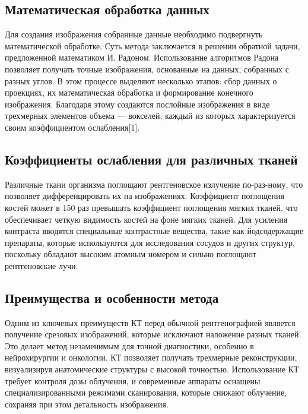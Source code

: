 \subsection{Математическая обработка данных}

Для создания изображения собранные данные необходимо подвергнуть математической обработке. Суть метода заключается в решении обратной задачи, предложенной математиком И. Радоном. Использование алгоритмов Радона позволяет получать точные изображения, основанные на данных, собранных с разных углов. В этом процессе выделяют несколько этапов: сбор данных о проекциях, их математическая обработка и формирование конечного изображения. Благодаря этому создаются послойные изображения в виде трехмерных элементов объема — вокселей, каждый из которых характеризуется своим коэффициентом ослабления[1].

\subsection{Коэффициенты ослабления для различных тканей}

Различные ткани организма поглощают рентгеновское излучение по-раз-ному, что позволяет дифференцировать их на изображениях. Коэффициент поглощения костей может в 150 раз превышать коэффициент поглощения мягких тканей, что обеспечивает четкую видимость костей на фоне мягких тканей. Для усиления контраста вводятся специальные контрастные вещества, такие как йодсодержащие препараты, которые используются для исследования сосудов и других структур, поскольку обладают высоким атомным номером и сильно поглощают рентгеновские лучи.

\subsection{Преимущества и особенности метода}

Одним из ключевых преимуществ КТ перед обычной рентгенографией является получение срезовых изображений, которые исключают наложение разных тканей. Это делает метод незаменимым для точной диагностики, особенно в нейрохирургии и онкологии. КТ позволяет получать трехмерные реконструкции, визуализируя анатомические структуры с высокой точностью. Использование КТ требует контроля дозы облучения, и современные аппараты оснащены специализированными режимами сканирования, которые снижают облучение, сохраняя при этом детальность изображения.


